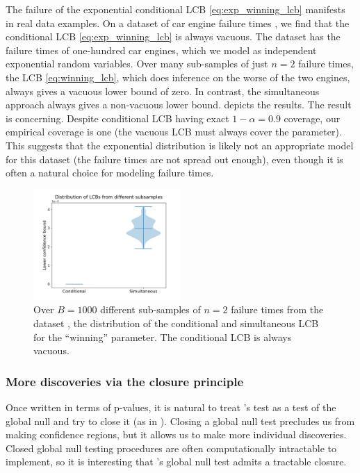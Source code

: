 \documentclass{article}
\begin{document}
The failure of the exponential conditional LCB \eqref{eq:exp_winning_lcb} manifests in real data examples. On a dataset of car engine failure times \citep{Molotaliev}, we find that the conditional LCB \eqref{eq:exp_winning_lcb} is always vacuous. The dataset has the failure times of one-hundred car engines, which we model as independent exponential random variables. Over many sub-samples of just $n=2$ failure times, the LCB \eqref{eq:winning_lcb}, which does inference on the worse of the two engines, always gives a vacuous lower bound of zero. In contrast, the simultaneous approach always gives a non-vacuous lower bound.  depicts the results. The result is concerning. Despite conditional LCB having exact $1-\alpha=0.9$ coverage, our empirical coverage is one (the vacuous LCB must always cover the parameter). This suggests that the exponential distribution is likely not an appropriate model for this dataset (the failure times are not spread out enough), even though it is often a natural choice for modeling failure times. 
\begin{figure}
    \centering
    \includegraphics[width=0.5\textwidth]{car_eng.pdf} %
    \caption{Over $B=1000$ different sub-samples of $n=2$ failure times from the dataset \cite{Molotaliev}, the distribution of the conditional and simultaneous LCB for the ``winning'' parameter. The conditional LCB is always vacuous.}
    \label{fig:car_engine}
\end{figure}

\subsubsection{More discoveries via the closure principle}

Once written in terms of p-values, it is natural to treat 's test as a test of the global null and try to close it (as in \cite{Marcus}). Closing a global null test precludes us from making confidence regions, but it allows us to make more individual discoveries. Closed global null testing procedures are often computationally intractable to implement, so it is interesting that 's global null test admits a tractable closure.  
\end{document}
